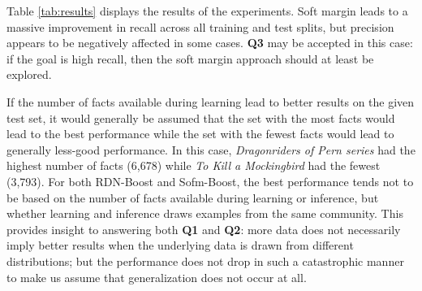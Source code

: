 \documentclass[letterpaper]{article}
\begin{document}
Table \ref{tab:results} displays the results of the experiments. Soft margin leads to a massive improvement in recall across all training and test splits, but precision appears to be negatively affected in some cases. \textbf{Q3} may be accepted in this case: if the goal is high recall, then the soft margin approach should at least be explored.

If the number of facts available during learning lead to better results on the given test set, it would generally be assumed that the set with the most facts would lead to the best performance while the set with the fewest facts would lead to generally less-good performance. In this case, \textit{Dragonriders of Pern series} had the highest number of facts (6,678) while \textit{To Kill a Mockingbird} had the fewest (3,793). For both RDN-Boost and Sofm-Boost, the best performance tends not to be based on the number of facts available during learning or inference, but whether learning and inference draws examples from the same community. This provides insight to answering both \textbf{Q1} and \textbf{Q2}: more data does not necessarily imply better results when the underlying data is drawn from different distributions; but the performance does not drop in such a catastrophic manner to make us assume that generalization does not occur at all.
\end{document}
